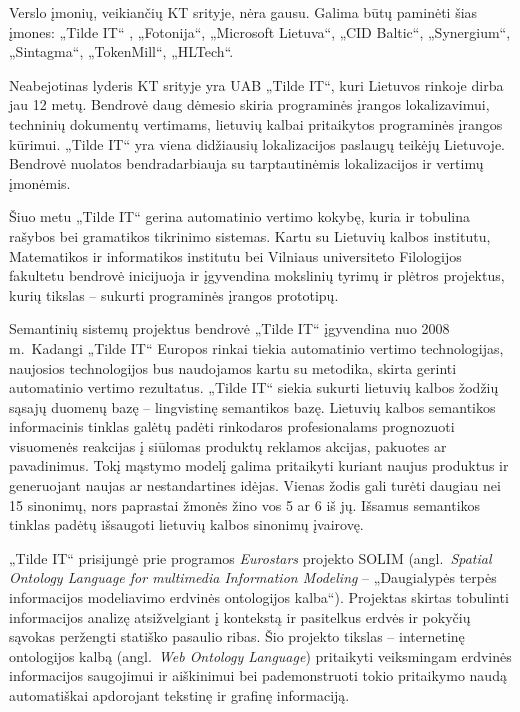 \begin{multicols}{2}
Verslo įmonių, veikiančių KT srityje, nėra gausu. Galima būtų paminėti šias įmones: „Tilde IT“ , „Fotonija“, „Microsoft Lietuva“,  „CID Baltic“,  „Synergium“, „Sintagma“, „TokenMill“, „HLTech“.

    Neabejotinas lyderis KT srityje yra UAB „Tilde IT“, kuri Lietuvos rinkoje dirba jau 12 metų. Bendrovė daug dėmesio skiria programinės įrangos lokalizavimui, techninių dokumentų vertimams, lietuvių kalbai pritaikytos programinės įrangos kūrimui. „Tilde IT“ yra viena didžiausių lokalizacijos paslaugų teikėjų Lietuvoje. Bendrovė nuolatos bendradarbiauja su tarptautinėmis lokalizacijos ir vertimų įmonėmis.   

    Šiuo metu „Tilde IT“ gerina automatinio vertimo kokybę, kuria ir tobulina rašybos bei gramatikos tikrinimo sistemas. Kartu su Lietuvių kalbos institutu, Matematikos ir informatikos institutu bei Vilniaus universiteto Filologijos fakultetu bendrovė inicijuoja ir įgyvendina mokslinių tyrimų ir plėtros projektus, kurių tikslas – sukurti programinės įrangos prototipų.  

    Semantinių sistemų projektus bendrovė „Tilde IT“ įgyvendina nuo 2008 m.~Kadangi „Tilde IT“ Europos rinkai tiekia automatinio vertimo technologijas, naujosios technologijos bus naudojamos kartu su metodika, skirta gerinti automatinio vertimo rezultatus. „Tilde IT“ siekia sukurti lietuvių kalbos žodžių sąsajų duomenų bazę – lingvistinę semantikos bazę. Lietuvių kalbos semantikos informacinis tinklas galėtų padėti rinkodaros profesionalams prognozuoti visuomenės reakcijas į siūlomas produktų reklamos akcijas, pakuotes ar pavadinimus. Tokį mąstymo modelį galima pritaikyti kuriant naujus produktus ir generuojant naujas ar nestandartines idėjas. Vienas žodis gali turėti daugiau nei 15 sinonimų, nors paprastai žmonės žino vos 5 ar 6 iš jų. Išsamus semantikos tinklas padėtų išsaugoti lietuvių kalbos sinonimų įvairovę.   

    „Tilde IT“ prisijungė prie programos \textit{Eurostars} projekto SOLIM (angl.~\textit{Spatial Ontology Language for multimedia Information Modeling} – „Daugialypės terpės informacijos modeliavimo erdvinės ontologijos kalba“). Projektas skirtas tobulinti informacijos analizę atsižvelgiant į kontekstą ir pasitelkus erdvės ir pokyčių sąvokas peržengti statiško pasaulio ribas. Šio projekto tikslas – internetinę ontologijos kalbą (angl.~\textit{Web Ontology Language}) pritaikyti veiksmingam erdvinės informacijos saugojimui ir aiškinimui bei pademonstruoti tokio pritaikymo naudą automatiškai apdorojant tekstinę ir grafinę informaciją.   


\end{multicols}

